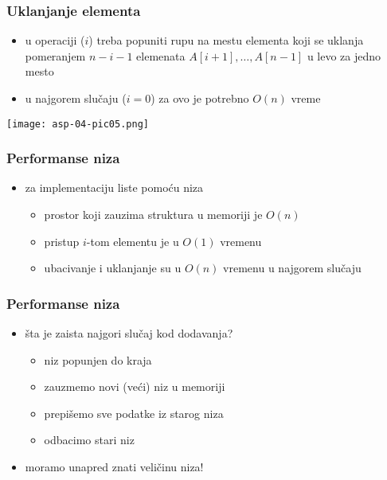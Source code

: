 \documentclass[compress]{beamer}
\begin{document}
\begin{frame}[fragile]
  \frametitle{Uklanjanje elementa}
  \begin{itemize}
    \item u operaciji ($i$) treba popuniti rupu na mestu elementa
    koji se uklanja pomeranjem $n-i-1$ elemenata $A[i+1], \ldots, A[n-1]$ u
    levo za jedno mesto
    \item u najgorem slučaju ($i = 0$) za ovo je potrebno $O(n)$ vreme
  \end{itemize}
  \begin{center}
    \texttt{[image: asp-04-pic05.png]}
  \end{center}
\end{frame}

\begin{frame}[fragile]
  \frametitle{Performanse niza}
  \begin{itemize}
    \item za implementaciju liste pomoću niza
    \begin{itemize}
      \item prostor koji zauzima struktura u memoriji je $O(n)$
      \item pristup $i$-tom elementu je u $O(1)$ vremenu
      \item ubacivanje i uklanjanje su u $O(n)$ vremenu u najgorem slučaju
    \end{itemize}
  \end{itemize}
\end{frame}

\begin{frame}[fragile]
  \frametitle{Performanse niza}
  \begin{itemize}
    \item šta je zaista najgori slučaj kod dodavanja?
    \begin{itemize}
      \item niz popunjen do kraja
      \item zauzmemo novi (veći) niz u memoriji
      \item prepišemo sve podatke iz starog niza
      \item odbacimo stari niz
    \end{itemize}
    \item moramo unapred znati veličinu niza!
  \end{itemize}
\end{frame}
\end{document}

